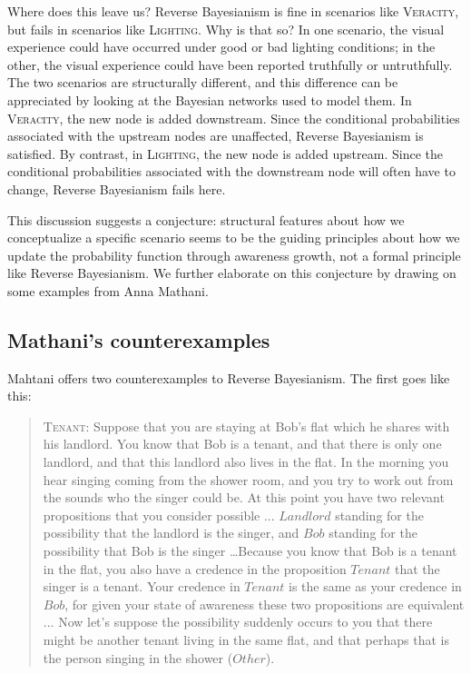 \documentclass[
  11pt,
  dvipsnames,enabledeprecatedfontcommands]{scrartcl}
\begin{document}
Where does this leave us? Reverse Bayesianism is fine in scenarios like
\textsc{Veracity}, but fails in scenarios like \textsc{Lighting}. Why is
that so? In one scenario, the visual experience could have occurred
under good or bad lighting conditions; in the other, the visual
experience could have been reported truthfully or untruthfully. The two
scenarios are structurally different, and this difference can be
appreciated by looking at the Bayesian networks used to model them. In
\textsc{Veracity}, the new node is added downstream. Since the
conditional probabilities associated with the upstream nodes are
unaffected, Reverse Bayesianism is satisfied. By contrast, in
\textsc{Lighting}, the new node is added upstream. Since the conditional
probabilities associated with the downstream node will often have to
change, Reverse Bayesianism fails here.

This discussion suggests a conjecture: structural features about how we
conceptualize a specific scenario seems to be the guiding principles
about how we update the probability function through awareness growth,
not a formal principle like Reverse Bayesianism. We further elaborate on
this conjecture by drawing on some examples from Anna Mathani.

\hypertarget{mathanis-counterexamples}{%
\subsection{Mathani's counterexamples}\label{mathanis-counterexamples}}

\label{sec:mathani}

Mahtani offers two counterexamples to Reverse Bayesianism. The first
goes like this:

\begin{quote}
\textsc{Tenant}: Suppose that you are staying at Bob's flat which he shares with his landlord. You know
that Bob is a tenant, and that there is only one landlord, and that this landlord also
lives in the flat. In the morning you hear singing coming from the shower room, and
you try to work out from the sounds who the singer could be. At this point you have
two relevant propositions that you consider possible ... $Landlord$ standing for the possibility that the landlord is the singer, and $Bob$ standing for the possibility that Bob is the singer  \dots  Because you know that Bob is a tenant in the flat, you also have a credence in the proposition $Tenant$ that the singer is a tenant. Your credence in $Tenant$ is the same as your credence in $Bob$, for given your state of awareness these two propositions are equivalent ... Now let's suppose the possibility suddenly occurs to you that there might be another tenant living in the same flat, and that perhaps that is the person singing in the shower ($Other$).
\end{quote}
\end{document}
